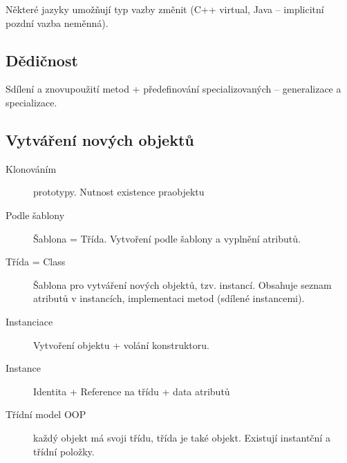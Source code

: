 \documentclass[a4paper, 11pt]{report}
\begin{document}
Některé jazyky umožňují typ vazby změnit (C++ virtual, Java -- implicitní pozdní vazba neměnná).

\subsection{Dědičnost}

Sdílení a znovupoužití metod + předefinování specializovaných -- generalizace a specializace.

\subsection{Vytváření nových objektů}
\begin{description}
	\item[Klonováním] prototypy. Nutnost existence praobjektu
	\item[Podle šablony] Šablona = Třída. Vytvoření podle šablony a vyplnění atributů.
\end{description}

\begin{description}
	\item[Třída = Class] Šablona pro vytváření nových objektů, tzv. instancí. Obsahuje seznam atributů v instancích, implementaci metod (sdílené instancemi).
	\item[Instanciace] Vytvoření objektu + volání konstruktoru.
	\item[Instance] Identita + Reference na třídu + data atributů
	\item[Třídní model OOP] každý objekt má svoji třídu, třída je také objekt. Existují instantční a třídní položky.
\end{description}
\end{document}
